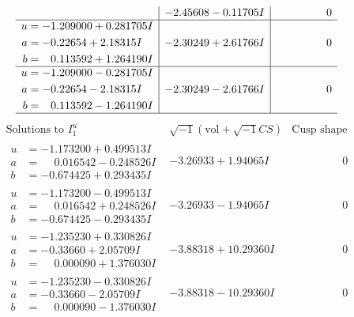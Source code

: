 \documentclass[1p]{elsarticle_modified}
\theoremstyle{definition}
\newcommand{\I}{\sqrt{-1}}
\begin{document}
$$\begin{array}{c|c|c}
 & -2.45608 - 0.11705 I & \phantom{-0.000000 } 0 \\ \hline\begin{aligned}
u &= -1.209000 + 0.281705 I \\
a &= -0.22654 + 2.18315 I \\
b &= \phantom{-}0.113592 + 1.264190 I\end{aligned}
 & -2.30249 + 2.61766 I & \phantom{-0.000000 } 0 \\ \hline\begin{aligned}
u &= -1.209000 - 0.281705 I \\
a &= -0.22654 - 2.18315 I \\
b &= \phantom{-}0.113592 - 1.264190 I\end{aligned}
 & -2.30249 - 2.61766 I & \phantom{-0.000000 } 0\\
 \hline 
 \end{array}$$\newpage$$\begin{array}{c|c|c}  
\text{Solutions to }I^u_{1}& \I (\text{vol} + \sqrt{-1}CS) & \text{Cusp shape}\\
 \hline 
\begin{aligned}
u &= -1.173200 + 0.499513 I \\
a &= \phantom{-}0.016542 - 0.248526 I \\
b &= -0.674425 + 0.293435 I\end{aligned}
 & -3.26933 + 1.94065 I & \phantom{-0.000000 } 0 \\ \hline\begin{aligned}
u &= -1.173200 - 0.499513 I \\
a &= \phantom{-}0.016542 + 0.248526 I \\
b &= -0.674425 - 0.293435 I\end{aligned}
 & -3.26933 - 1.94065 I & \phantom{-0.000000 } 0 \\ \hline\begin{aligned}
u &= -1.235230 + 0.330826 I \\
a &= -0.33660 + 2.05709 I \\
b &= \phantom{-}0.000090 + 1.376030 I\end{aligned}
 & -3.88318 + 10.29360 I & \phantom{-0.000000 } 0 \\ \hline\begin{aligned}
u &= -1.235230 - 0.330826 I \\
a &= -0.33660 - 2.05709 I \\
b &= \phantom{-}0.000090 - 1.376030 I\end{aligned}
 & -3.88318 - 10.29360 I & \phantom{-0.000000 } 0 \\ \hline\begin{aligned}

\end{aligned}
\end{array}$$
\end{document}
